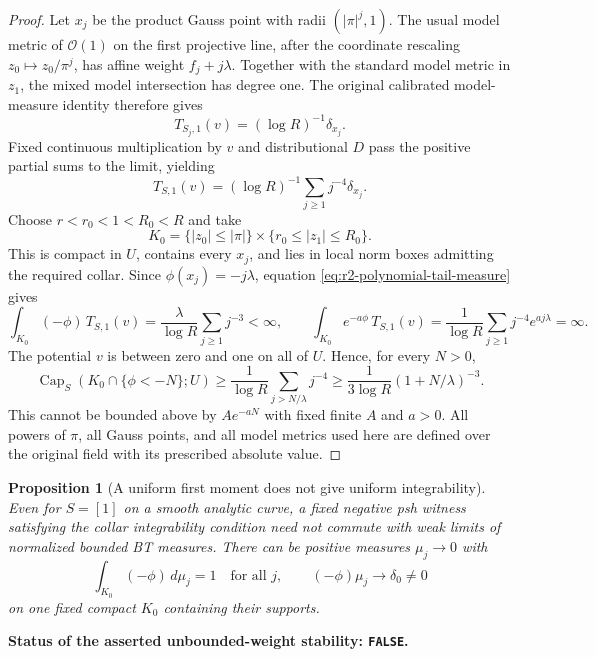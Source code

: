 \documentclass[11pt,a4paper]{article}
\numberwithin{equation}{section}
\newtheorem{proposition}[theorem]{Proposition}
\theoremstyle{definition}
\theoremstyle{remark}
\begin{document}
\begin{proof}
Let $x_j$ be the product Gauss point with radii $(|\pi|^j,1)$.
The usual model metric of $\mathcal O(1)$ on the first projective
line, after the coordinate rescaling $z_0\mapsto z_0/\pi^j$,
has affine weight $f_j+j\lambda$. Together with the standard
model metric in $z_1$, the mixed model intersection has degree
one. The original calibrated model-measure identity therefore gives
\[
 T_{S_j,1}(v)=(\log R)^{-1}\delta_{x_j}.
\]
Fixed continuous multiplication by $v$ and distributional $D$
pass the positive partial sums to the limit, yielding
\begin{equation}
\label{eq:r2-polynomial-tail-measure}
 T_{S,1}(v)=(\log R)^{-1}
                            \sum_{j\geq1}j^{-4}\delta_{x_j}.
\end{equation}
Choose $r<r_0<1<R_0<R$ and take
\[
 K_0=\{|z_0|\leq|\pi|\}
                      \times\{r_0\leq|z_1|\leq R_0\}.
\]
This is compact in $U$, contains every $x_j$, and lies in local
norm boxes admitting the required collar. Since
$\phi(x_j)=-j\lambda$, equation
\eqref{eq:r2-polynomial-tail-measure} gives
\[
 \int_{K_0}(-\phi)\,T_{S,1}(v)
      =\frac{\lambda}{\log R}\sum_{j\geq1}j^{-3}<\infty,
 \qquad
 \int_{K_0}e^{-a\phi}\,T_{S,1}(v)
      =\frac1{\log R}\sum_{j\geq1}j^{-4}e^{aj\lambda}=\infty.
\]
The potential $v$ is between zero and one on all of $U$. Hence,
for every $N>0$,
\[
 \operatorname{Cap}_S(K_0\cap\{\phi<-N\};U)
 \geq\frac1{\log R}\sum_{j>N/\lambda}j^{-4}
 \geq\frac1{3\log R}(1+N/\lambda)^{-3}.
\]
This cannot be bounded above by $A e^{-aN}$ with fixed finite
$A$ and $a>0$. All powers of $\pi$, all Gauss points, and all
model metrics used here are defined over the original field with
its prescribed absolute value.
\end{proof}

\begin{proposition}[A uniform first moment does not give uniform integrability]
\label{prop:r2-unbounded-weight-failure}
Even for $S=[1]$ on a smooth analytic curve, a fixed negative psh
witness satisfying the collar integrability condition need not
commute with weak limits of normalized bounded BT measures.
There can be positive measures $\mu_j\to0$ with
\[
 \int_{K_0}(-\phi)\,d\mu_j=1\quad\text{for all }j,
 \qquad (-\phi)\mu_j\longrightarrow\delta_0\ne0
\]
on one fixed compact $K_0$ containing their supports.
\end{proposition}

\noindent\textbf{Status of the asserted unbounded-weight stability:
\texttt{FALSE}.}
\end{document}
